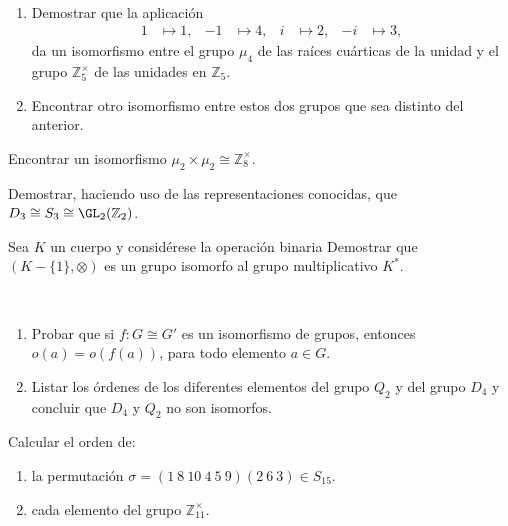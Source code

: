 \begin{ejercicio}\label{ej:2.26}~
    \begin{enumerate}
        \item Demostrar que la aplicación
        \begin{align*}
            1 &\mapsto 1, & -1 &\mapsto 4, & i &\mapsto 2, & -i &\mapsto 3,
        \end{align*}
        da un isomorfismo entre el grupo $\mu_4$ de las raíces cuárticas de la unidad y el grupo $\mathbb{Z}^{\times}_5$ de las unidades en $\mathbb{Z}_5$.
        \item Encontrar otro isomorfismo entre estos dos grupos que sea distinto del anterior.
    \end{enumerate}
\end{ejercicio}

\begin{ejercicio}\label{ej:2.27}
    Encontrar un isomorfismo $\mu_2 \times \mu_2 \cong \mathbb{Z}^{\times}_8$.
\end{ejercicio}

\begin{ejercicio}\label{ej:2.28}
    Demostrar, haciendo uso de las representaciones conocidas, que $D_3 \cong S_3 \cong \GL_2(\mathbb{Z}_2)$.
\end{ejercicio}

\begin{ejercicio}\label{ej:2.29}
    Sea $K$ un cuerpo y considérese la operación binaria
    Demostrar que $(K - \{1\}, \otimes)$ es un grupo isomorfo al grupo multiplicativo $K^{\ast}$.
\end{ejercicio}

\begin{ejercicio}\label{ej:2.30}~
    \begin{enumerate}
        \item Probar que si $f : G \cong G'$ es un isomorfismo de grupos, entonces $o(a) = o(f(a))$, para todo elemento $a \in G$.
        \item Listar los órdenes de los diferentes elementos del grupo $Q_2$ y del grupo $D_4$ y concluir que $D_4$ y $Q_2$ no son isomorfos.
    \end{enumerate}
\end{ejercicio}

\begin{ejercicio}\label{ej:2.31}
    Calcular el orden de:
    \begin{enumerate}
        \item la permutación $\sigma = (1\ 8\ 10\ 4\ 5\ 9)(2\ 6\ 3) \in S_{15}$.
        \item cada elemento del grupo $\mathbb{Z}^{\times}_{11}$.
    \end{enumerate}
\end{ejercicio}

